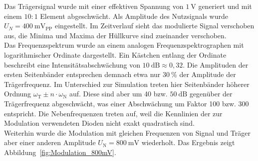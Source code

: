 \documentclass[a4paper,twoside,final]{article}
\begin{document}
Das Trägersignal wurde mit einer effektiven Spannung von $\SI{1}{\volt}$ generiert und mit einem $10:1$ Element abgeschwächt. Als Amplitude des Nutzsignals wurde $U_N = \SI{400}{\milli\volt_\text{PP}}$ eingestellt. Im Zeitverlauf sieht das modulierte Signal verschoben aus, die Minima und Maxima der Hüllkurve sind zueinander verschoben.\\
Das Frequenzspektrum wurde an einem analogen Frequenzspektrographen mit logarithmischer Ordinate dargestellt. Ein Kästchen entlang der Ordinate beschreibt eine Intensitätsabschwächung von $\SI{10}{\deci\bel} \approx 0,32$. Die Amplituden der ersten Seitenbänder entsprechen demnach etwa nur $\SI{30}{\percent}$ der Amplitude der Trägerfrequenz. Im Unterschied zur Simulation treten hier Seitenbänder höherer Ordnung $\omega_\text{T}\pm n\cdot \omega_\text{N}$ auf. Diese sind aber um 40 bzw. $\SI{50}{\deci\bel}$ gegenüber der Trägerfrequenz abgeschwächt, was einer Abschwächung um Faktor 100 bzw. 300 entspricht. Die Nebenfrequenzen treten auf, weil die Kennlinien der zur Modulation verwendeten Dioden nicht exakt quadratisch sind.\\ %
Weiterhin wurde die Modulation mit gleichen Frequenzen von Signal und Träger aber einer anderen Amplitude $U_\text{N} = \SI{800}{\milli\volt}$ wiederholt. Das Ergebnis zeigt Abbildung~\ref{fig:Modulation_800mV}.
\end{document}
